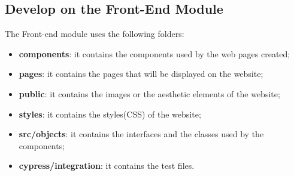 \subsection{Develop on the Front-End Module}
The Front-end module uses the following folders:
\begin{itemize}
\item \textbf{components}: it contains the components used by the web pages created;
\item \textbf{pages}: it contains the pages that will be displayed on the website;
\item \textbf{public}: it contains the images or the aesthetic elements of the website;
\item \textbf{styles}: it contains the styles(CSS) of the website;
\item \textbf{src/objects}: it contains the interfaces and the classes used by the components;
\item \textbf{cypress/integration}: it contains the test files. 
\end{itemize}